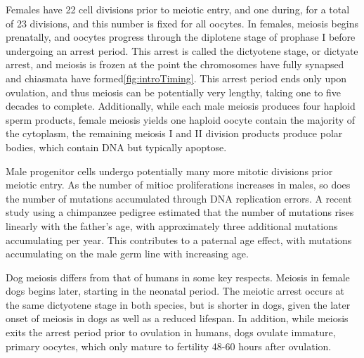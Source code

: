Females have 22 cell divisions prior to meiotic entry, and one during, for a total of 23 divisions\cite{Crow2000a}, and this number is fixed for all oocytes.
In females, meiosis begins prenatally, and oocytes progress through the diplotene stage of prophase I before undergoing an arrest period\cite{Hassold2001,Crow2000a}.
This arrest is called the dictyotene stage, or dictyate arrest, and meiosis is frozen at the point the chromosomes have fully synapsed and chiasmata have formed\ref{fig:introTiming}.
This arrest period ends only upon ovulation, and thus meiosis can be potentially very lengthy, taking one to five decades to complete.
Additionally, while each male meiosis produces four haploid sperm products, female meiosis yields one haploid oocyte contain the majority of the cytoplasm, the remaining meiosis I and II division products produce polar bodies, which contain DNA but typically apoptose\cite{Schmerler2011}.

Male progenitor cells undergo potentially many more mitotic divisions prior meiotic entry.
As the number of mitioc proliferations increases in males, so does the number of mutations accumulated through DNA replication errors.
A recent study using a chimpanzee pedigree estimated that the number of mutations rises linearly with the father's age, with approximately three additional mutations accumulating per year\cite{Venn2014}.
This contributes to a paternal age effect, with mutations accumulating on the male germ line with increasing age.

Dog meiosis differs from that of humans in some key respects.
Meiosis in female dogs begins later, starting in the neonatal period\cite{Freixa1987}.
The meiotic arrest occurs at the same dictyotene stage in both species, but is shorter in dogs, given the later onset of meiosis in dogs as well as a reduced lifespan.
In addition, while meiosis exits the arrest period prior to ovulation in humans, dogs ovulate immature, primary oocytes, which only mature to fertility 48-60 hours after ovulation\cite{Tsutsui1989,Chastant-Maillard2011}.


